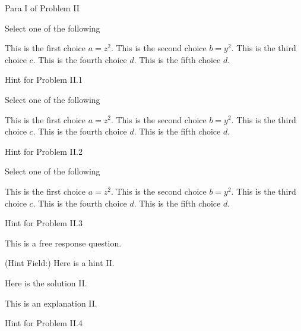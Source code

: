 \begin{mproblem}
\begin{gram}[200]
Para I of Problem II
\end{gram}


\begin{problem}[210][Problem II.1]
Select one of the following
\begin{xchoice}
\choice This is the first choice $a = z^2$.
\choice This is the second choice $b = y^2$.
\choice* This is the third choice $c$.
\choice* This is the fourth choice $d$.
\choice This is the fifth choice $d$.
\end{xchoice}
\help Hint  for Problem II.1
\end{problem}


\begin{problem}[220][Problem II.2]
Select one of the following
\begin{xchoice}
\choice This is the first choice $a = z^2$.
\choice This is the second choice $b = y^2$.
\choice* This is the third choice $c$.
\choice* This is the fourth choice $d$.
\choice This is the fifth choice $d$.
\end{xchoice}
\help 
Hint  for Problem II.2
\end{problem}

\begin{problem}[230][Problem II.3]
Select one of the following
\begin{xchoice}
\choice This is the first choice $a = z^2$.
\choice This is the second choice $b = y^2$.
\choice* This is the third choice $c$.
\choice* This is the fourth choice $d$.
\choice This is the fifth choice $d$.
\end{xchoice}

\help
Hint  for Problem II.3
\end{problem}


\begin{problem}[240][Problem II.4]
This is a free response question.

\help
(Hint Field:) Here is a hint II.

\sol
Here is the solution II.

\explain
This is an explanation II.

\help
Hint  for Problem II.4
\end{problem}


\end{mproblem}
